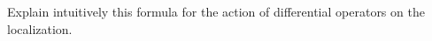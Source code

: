 \begin{remark}
    Explain intuitively this formula for the action of differential operators on the
    localization.
\end{remark}


%
%
%


